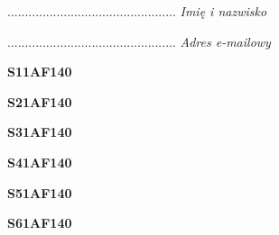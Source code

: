 \begin{turn}{90}\begin{minipage}{\linewidth} \vspace{20mm} ................................................  \textit{Imię i nazwisko}\end{minipage}\end{turn}

\begin{turn}{90}\begin{minipage}{\linewidth} \vspace{20mm} ................................................  \textit{Adres e-mailowy}\end{minipage}\end{turn}

\begin{turn}{90}\huge \begin{minipage}{\linewidth} \vspace{10mm}\textbf{S11AF140}\end{minipage}\end{turn}

\begin{turn}{90}\huge \begin{minipage}{\linewidth} \vspace{10mm}\textbf{S21AF140}\end{minipage}\end{turn}

\begin{turn}{90}\huge \begin{minipage}{\linewidth} \vspace{10mm}\textbf{S31AF140}\end{minipage}\end{turn}

\begin{turn}{90}\huge \begin{minipage}{\linewidth} \vspace{10mm}\textbf{S41AF140}\end{minipage}\end{turn}

\begin{turn}{90}\huge \begin{minipage}{\linewidth} \vspace{10mm}\textbf{S51AF140}\end{minipage}\end{turn}

\begin{turn}{90}\huge \begin{minipage}{\linewidth} \vspace{10mm}\textbf{S61AF140}\end{minipage}\end{turn}

